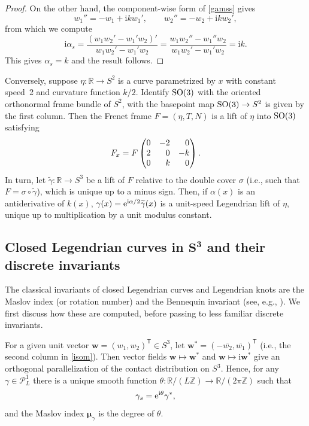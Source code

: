 \documentclass[pdftex]{sigma}
\newcommand\Legu{ {\mathcal P}^1} %
\newcommand\kk{k} %
\def\ri{\mathrm{i}}
\def\gam{\gamma} %
\def\R{\mathbb R}
\def\Z{\mathbb Z}
\newcommand\bw{\mathbf w}
\newcommand\gamt{\widetilde{\gam}}
\numberwithin{equation}{section}
\begin{document}
\begin{proof}
On the other hand, the component-wise form of \eqref{gamss} gives
\[
w_1''=-w_1+\ri\kk w_1', \qquad w_2''=-w_2+\ri\kk w_2',
\]
from which we compute
\[\ri \alpha_s = \frac{(w_1 w_2' - w_1' w_2)'}{ w_1 w_2' - w_1' w_2}=\frac{w_1 w_2'' - w_1'' w_2}{ w_1 w_2' - w_1' w_2} = \ri \kk.\]
This gives $\alpha_s=\kk$ and the result follows.
\end{proof}

\begin{Remark}\label{LiftingRemark}
Conversely, suppose $\eta\colon\R \to S^2$ is a curve parametrized by $x$ with constant speed~2 and curvature function $\kk/2$. Identify ${\rm SO}(3)$ with the oriented orthonormal frame bundle of $S^2$, with the basepoint map ${\rm SO}(3)\to S^2$ is given by the first column. Then the Frenet frame $F=(\eta, T, N)$ is a lift of $\eta$ into ${\rm SO}(3)$ satisfying
\[F_x = F \begin{pmatrix} 0 & -2 & \hphantom{-}0 \\ 2 & \hphantom{-}0 & -\kk \\ 0 & \hphantom{-}\kk & \hphantom{-}0 \end{pmatrix}.\]
In turn, let $\gamt\colon\R \to S^3$ be a lift of $F$ relative to the double cover $\sigma$ \big(i.e., such that $F = \sigma\circ \gamt$\big), which is unique
up to a minus sign. Then, if $\alpha(x)$ is an antiderivative of $\kk(x)$,
$\gam(x) = {\rm e}^{\ri \alpha/2} \gamt(x)$ is a unit-speed Legendrian lift of $\eta$, unique up to multiplication by a unit modulus constant.
\end{Remark}

\subsection[Closed Legendrian curves in S\^{}3 and their discrete invariants]{Closed Legendrian curves in $\boldsymbol{S^3}$ and their discrete invariants}

The classical invariants of closed Legendrian curves and Legendrian knots are the Maslov index (or rotation number) and the Bennequin invariant (see, e.g., \cite{ET1}).
We first discuss how these are computed, before passing to less familiar discrete invariants.

For a given unit vector $\bw = (w_1, w_2)^{\mathsf{T}} \in S^3$, let $\bw^* = (-\overline{w_2}, \overline{w_1})^{\mathsf{T}}$ (i.e., the second column in \eqref{isom}).
 Then vector fields $\bw \mapsto \bw^*$ and $\bw \mapsto \ri \bw^*$ give an orthogonal parallelization of the contact distribution on $S^3$.
Hence, for any $\gam \in \Legu_L$ there is a unique smooth function $\theta\colon\R/(L\Z)\to \R/(2\pi\Z)$ such that
\begin{equation}\label{Masloveq}
\gam_s={\rm e}^{\ri\theta}\gam^*,
\end{equation}
and the Maslov index ${\boldsymbol{\mu}}_{\gamma}$ is the degree of $\theta$.
\end{document}
